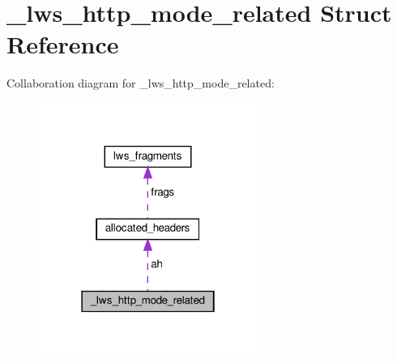 \hypertarget{struct__lws__http__mode__related}{}\section{\+\_\+lws\+\_\+http\+\_\+mode\+\_\+related Struct Reference}
\label{struct__lws__http__mode__related}


Collaboration diagram for \+\_\+lws\+\_\+http\+\_\+mode\+\_\+related\+:
\nopagebreak
\begin{figure}[H]
\begin{center}
\leavevmode
\includegraphics[width=202pt]{struct__lws__http__mode__related__coll__graph}
\end{center}
\end{figure}
